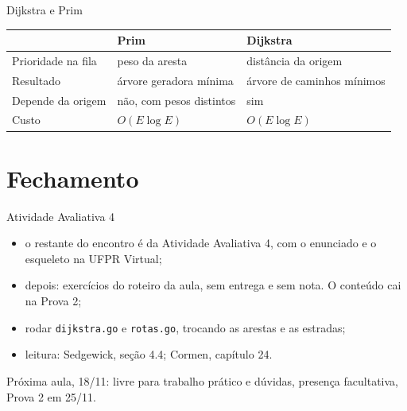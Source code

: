 \documentclass{beamer}
\begin{document}
\begin{frame}{Dijkstra e Prim}
	\begin{center}
		\scalebox{0.62}{\agmCaminhos}
	\end{center}
	\scriptsize
	\begin{center}
		\begin{tabular}{lll}
			\toprule
			                   & Prim                     & Dijkstra                   \\
			\midrule
			Prioridade na fila & peso da aresta           & distância da origem        \\
			Resultado          & árvore geradora mínima   & árvore de caminhos mínimos \\
			Depende da origem  & não, com pesos distintos & sim                        \\
			Custo              & $O(E \log E)$            & $O(E \log E)$              \\
			\bottomrule
		\end{tabular}
	\end{center}
\end{frame}

\section{Fechamento}

\begin{frame}{Atividade Avaliativa 4}
	\begin{itemize}
		\item o restante do encontro é da Atividade Avaliativa 4, com o enunciado e
		      o esqueleto na UFPR Virtual;
		\item depois: exercícios do roteiro da aula, sem entrega e sem nota. O
		      conteúdo cai na Prova 2;
		\item rodar \texttt{dijkstra.go} e \texttt{rotas.go}, trocando as arestas e
		      as estradas;
		\item leitura: Sedgewick, seção 4.4; Cormen, capítulo 24.
	\end{itemize}

	\vspace{0.4cm}
	Próxima aula, 18/11: livre para trabalho prático e dúvidas, presença facultativa, Prova 2 em 25/11.
\end{frame}
\end{document}
